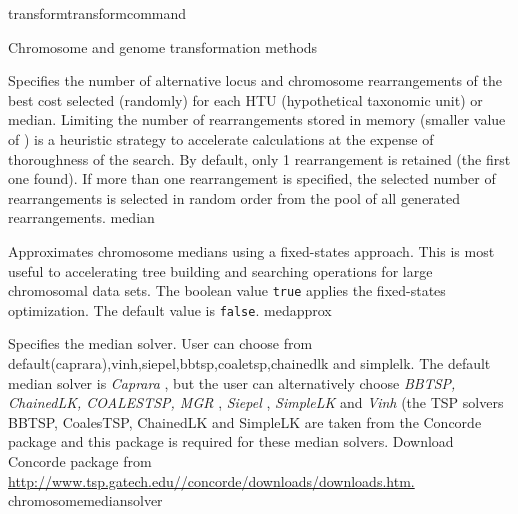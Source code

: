 \begin{command}{transform}{transformcommand}
\begin{arguments}
\begin{argumentgroup}{Chromosome and genome transformation methods}
\begin{description}
{Specifies the number of alternative locus and chromosome
rearrangements of the best cost selected (randomly) for
each HTU (hypothetical taxonomic unit) or median. Limiting the number of rearrangements
stored in memory (smaller value of )
is a heuristic strategy to accelerate calculations at the
expense of thoroughness of the search. By default, only 1
rearrangement is retained (the first one found). If more than
one rearrangement is specified, the selected number of
rearrangements is selected in random order from the pool of
all generated rearrangements.}
{median}

{Approximates chromosome medians using a fixed-states
approach. This is most useful to accelerating tree
building and searching operations for large chromosomal
data sets. The boolean value \texttt{true} applies the
fixed-states optimization. The default value is
\texttt{false}.}
{medapprox}

{Specifies the median solver. User can choose from
default(caprara),vinh,siepel,bbtsp,coaletsp,chainedlk and simplelk. 
The default median solver is \emph{Caprara} \cite{Caprara2001}, 
but the user can alternatively choose \emph{BBTSP, ChainedLK, 
COALESTSP, MGR} \cite{bourqueandpevzner2002}, 
\emph{Siepel} \cite{siepelmoret2001}, \emph{SimpleLK} 
and \emph{Vinh} (the TSP solvers BBTSP, CoalesTSP, 
ChainedLK and SimpleLK are taken from the Concorde package and this package
is required for these median solvers. Download Concorde package from \\
\url{http://www.tsp.gatech.edu//concorde/downloads/downloads.htm. } }
{chromosomemediansolver}



\end{description}
\end{argumentgroup}
\end{arguments}
\end{command}
